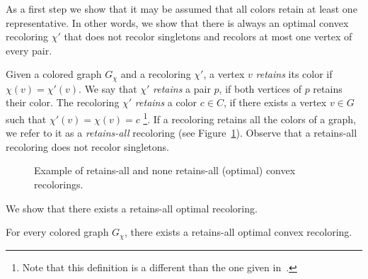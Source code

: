 As a first step we show that it may be assumed that all 
colors retain at least one representative.
%
In other words,
we show that there is always an optimal convex recoloring $\chi'$ 
that does not recolor singletons and recolors at most one vertex of every pair. 

Given a colored graph $G_\chi$ and a recoloring $\chi'$, 
a vertex $v$ \emph{retains} its color if $\chi(v)=\chi'(v)$. 
%
We say that $\chi'$ \emph{retains} a pair $p$, 
if both vertices of $p$ retains their color.  
%
The recoloring $\chi'$ \emph{retains} a color $c \in C$,
if there exists a vertex $v \in G$ such that ${\chi'(v) = \chi(v) = c}$
\footnote{
Note that this definition is a different than the one given in~\cite{kanj2009convex}.
}.
%
If a recoloring retains all the colors of a graph, 
we refer to it as a \emph{retains-all} recoloring (see Figure~\ref{fig:retains-all}).
Observe that a retains-all recoloring does not recolor singletons.

\begin{figure}
\centering

\caption{
\label{fig:retains-all}
Example of retains-all and none retains-all (optimal) convex recolorings.
}
\end{figure}
%
We show that there exists a retains-all optimal recoloring.

\begin{lemma}
\label{lm:retains-all}
For every colored graph $G_\chi$, 
there exists a retains-all optimal convex recoloring.
\end{lemma}

